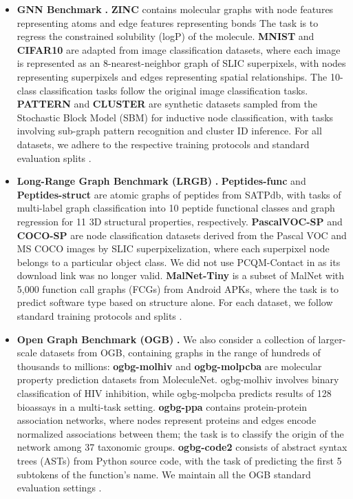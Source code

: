 \begin{itemize}[leftmargin=*,noitemsep,topsep=0pt]
    \item \textbf{GNN Benchmark} \cite{dwivedi2023benchmarking}\textbf{.}  \textbf{ZINC} contains molecular graphs with node features representing atoms and edge features representing bonds The task is to regress the constrained solubility (logP) of the molecule. \textbf{MNIST} and \textbf{CIFAR10} are adapted from image classification datasets, where each image is represented as an 8-nearest-neighbor graph of SLIC superpixels, with nodes representing superpixels and edges representing spatial relationships. The 10-class classification tasks follow the original image classification tasks. \textbf{PATTERN} and \textbf{CLUSTER} are synthetic datasets sampled from the Stochastic Block Model (SBM) for inductive node classification, with tasks involving sub-graph pattern recognition and cluster ID inference. For all datasets, we adhere to the respective training protocols and standard evaluation splits \cite{dwivedi2023benchmarking}.
    \item \textbf{Long-Range Graph Benchmark (LRGB)} \cite{dwivedi2022long,freitas2021large}\textbf{.} \textbf{Peptides-func} and \textbf{Peptides-struct} are atomic graphs of peptides from SATPdb, with tasks of multi-label graph classification into 10 peptide functional classes and graph regression for 11 3D structural properties, respectively. \textbf{PascalVOC-SP} and \textbf{COCO-SP} are node classification datasets derived from the Pascal VOC and MS COCO images by SLIC superpixelization, where each superpixel node belongs to a particular object class. We did not use PCQM-Contact in \cite{dwivedi2022long} as its download link was no longer valid. \textbf{MalNet-Tiny} \cite{freitas2021large} is a subset of MalNet with 5,000 function call graphs (FCGs) from Android APKs, where the task is to predict software type based on structure alone. For each dataset, we follow standard training protocols and splits \cite{dwivedi2022long,freitas2021large}.
    \item \textbf{Open Graph Benchmark (OGB)} \cite{hu2020open}\textbf{.} We also consider a collection of larger-scale datasets from OGB, containing graphs in the range of hundreds of thousands to millions: \textbf{ogbg-molhiv} and \textbf{ogbg-molpcba} are molecular property prediction datasets from MoleculeNet. ogbg-molhiv involves binary classification of HIV inhibition, while ogbg-molpcba predicts results of 128 bioassays in a multi-task setting. \textbf{ogbg-ppa} contains protein-protein association networks, where nodes represent proteins and edges encode normalized associations between them; the task is to classify the origin of the network among 37 taxonomic groups. \textbf{ogbg-code2} consists of abstract syntax trees (ASTs) from Python source code, with the task of predicting the first 5 subtokens of the function’s name. We maintain all the OGB standard evaluation settings \cite{hu2020open}.
\end{itemize}

